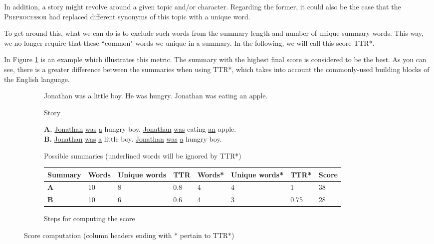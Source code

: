 In addition, a story might revolve around a given topic and/or character. Regarding the former, it could also be the case that the \textsc{Preprocessor} had replaced different synonyms of this topic with a unique word.

To get around this, what we can do is to exclude such words from the summary length and number of unique summary words. This way, we no longer require that these ``common" words we unique in a summary. In the following, we will call this score TTR*.

In Figure \ref{fig:score_example} is an example which illustrates this metric. The summary with the highest final score is considered to be the best. As you can see, there is a greater difference between the summaries when using TTR*, which takes into account the commonly-used building blocks of the English language.

\begin{figure}[H]
\begin{subfigure}{\textwidth}
\begin{displayquote}
Jonathan was a little boy. He was hungry. Jonathan was eating an apple.
\end{displayquote}
\caption{Story}
\vspace{\baselineskip}
\end{subfigure}
\begin{subfigure}{\textwidth}
\begin{displayquote}
\textbf{A.} \underline{Jonathan} \underline{was} \underline{a} hungry boy. \underline{Jonathan} \underline{was} eating \underline{an} apple.\\
\textbf{B.} \underline{Jonathan} \underline{was} \underline{a} little boy. \underline{Jonathan} \underline{was} \underline{a} hungry boy.
\end{displayquote}
\caption{Possible summaries (underlined words will be ignored by TTR*)}
\vspace{\baselineskip}
\end{subfigure}
\begin{subfigure}{\textwidth}
\centering
\begin{tabular}{@{}llllllll@{}}
\toprule
Summary & Words & Unique words & TTR & Words* & Unique words* & TTR* & Score \\ \midrule
\textbf{A} & 10    & 8            & 0.8 & 4      & 4             & 1    & 38    \\
\textbf{B} & 10    & 6            & 0.6 & 4      & 3             & 0.75 & 28    \\ \bottomrule
\end{tabular}
\caption{Steps for computing the score}
\end{subfigure}
\caption{Score computation (column headers ending with * pertain to TTR*)}
\label{fig:score_example}
\end{figure}

